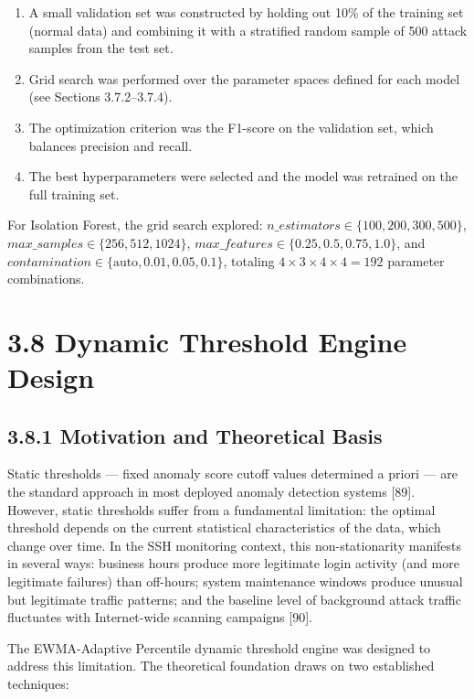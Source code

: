 \documentclass[
  a4paper]{report}
\providecommand{\tightlist}{%
  \setlength{\itemsep}{0pt}\setlength{\parskip}{0pt}}
\begin{document}
\begin{enumerate}
\def\labelenumi{\arabic{enumi}.}
\tightlist
\item
  A small validation set was constructed by holding out 10\% of the
  training set (normal data) and combining it with a stratified random
  sample of 500 attack samples from the test set.
\item
  Grid search was performed over the parameter spaces defined for each
  model (see Sections 3.7.2--3.7.4).
\item
  The optimization criterion was the F1-score on the validation set,
  which balances precision and recall.
\item
  The best hyperparameters were selected and the model was retrained on
  the full training set.
\end{enumerate}

For Isolation Forest, the grid search explored:
\(n\_estimators \in \{100, 200, 300, 500\}\),
\(max\_samples \in \{256, 512, 1024\}\),
\(max\_features \in \{0.25, 0.5, 0.75, 1.0\}\), and
\(contamination \in \{\text{auto}, 0.01, 0.05, 0.1\}\), totaling
\(4 \times 3 \times 4 \times 4 = 192\) parameter combinations.

\section{3.8 Dynamic Threshold Engine
Design}\label{dynamic-threshold-engine-design}

\subsection{3.8.1 Motivation and Theoretical
Basis}\label{motivation-and-theoretical-basis}

Static thresholds --- fixed anomaly score cutoff values determined a
priori --- are the standard approach in most deployed anomaly detection
systems {[}89{]}. However, static thresholds suffer from a fundamental
limitation: the optimal threshold depends on the current statistical
characteristics of the data, which change over time. In the SSH
monitoring context, this non-stationarity manifests in several ways:
business hours produce more legitimate login activity (and more
legitimate failures) than off-hours; system maintenance windows produce
unusual but legitimate traffic patterns; and the baseline level of
background attack traffic fluctuates with Internet-wide scanning
campaigns {[}90{]}.

The EWMA-Adaptive Percentile dynamic threshold engine was designed to
address this limitation. The theoretical foundation draws on two
established techniques:
\end{document}
